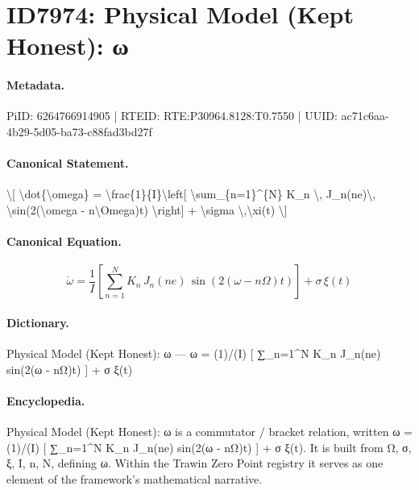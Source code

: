 \section*{ID7974: Physical Model (Kept Honest): ω}
\paragraph{Metadata.}
PiID: 6264766914905 | RTEID: RTE:P30964.8128:T0.7550 | UUID: ac71c6aa-4b29-5d05-ba73-c88fad3bd27f

\paragraph{Canonical Statement.}
\textbackslash{}[ \textbackslash{}dot\{\textbackslash{}omega\} = \textbackslash{}frac\{1\}\{I\}\textbackslash{}left[ \textbackslash{}sum\_\{n=1\}\textasciicircum{}\{N\} K\_n \textbackslash{}, J\_n(ne)\textbackslash{}, \textbackslash{}sin(2(\textbackslash{}omega - n\textbackslash{}Omega)t) \textbackslash{}right] + \textbackslash{}sigma \textbackslash{},\textbackslash{}xi(t) \textbackslash{}]

\paragraph{Canonical Equation.}
\[
\dot{\omega} = \frac{1}{I}\left[ \sum_{n=1}^{N} K_n \, J_n(ne)\, \sin(2(\omega - n\Omega)t) \right] + \sigma \,\xi(t)
\]

\paragraph{Dictionary.}
Physical Model (Kept Honest): ω — ω = (1)/(I) [ ∑\_n=1\textasciicircum{}N K\_n J\_n(ne) sin(2(ω - nΩ)t) ] + σ ξ(t)

\paragraph{Encyclopedia.}
Physical Model (Kept Honest): ω is a commutator / bracket relation, written ω = (1)/(I) [ ∑\_n=1\textasciicircum{}N K\_n J\_n(ne) sin(2(ω - nΩ)t) ] + σ ξ(t). It is built from Ω, σ, ξ, I, n, N, defining ω. Within the Trawin Zero Point registry it serves as one element of the framework's mathematical narrative.

